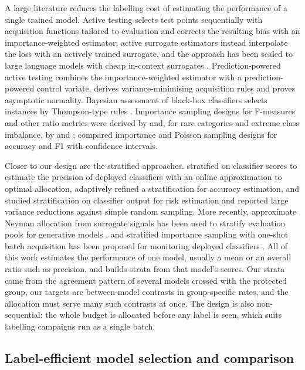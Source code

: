 A large literature reduces the labelling cost of estimating the performance of a single trained model. Active testing \citep{kossen2021active} selects test points sequentially with acquisition functions tailored to evaluation and corrects the resulting bias with an importance-weighted estimator; active surrogate estimators \citep{kossen2022ase} instead interpolate the loss with an actively trained surrogate, and the approach has been scaled to large language models with cheap in-context surrogates \citep{berrada2025}. Prediction-powered active testing \citep{ashouritaklimi2026} combines the importance-weighted estimator with a prediction-powered control variate, derives variance-minimising acquisition rules and proves asymptotic normality. Bayesian assessment of black-box classifiers selects instances by Thompson-type rules \citep{ji2021active}. Importance sampling designs for F-measures and other ratio metrics were derived by \citet{sawade2010fmeasure} and, for rare categories and extreme class imbalance, by \citet{poms2021} and \citet{marchant2017}; \citet{yilmaz2021} compared importance and Poisson sampling designs for accuracy and F1 with confidence intervals.

Closer to our design are the stratified approaches. \citet{bennett2010online} stratified on classifier scores to estimate the precision of deployed classifiers with an online approximation to optimal allocation, \citet{katariya2012} adaptively refined a stratification for accuracy estimation, and \citet{kumar2018classifier} studied stratification on classifier output for risk estimation and reported large variance reductions against simple random sampling. More recently, approximate Neyman allocation from surrogate signals has been used to stratify evaluation pools for generative models \citep{liu2026neyman}, and stratified importance sampling with one-shot batch acquisition has been proposed for monitoring deployed classifiers \citep{marsigli2026}. All of this work estimates the performance of one model, usually a mean or an overall ratio such as precision, and builds strata from that model's scores. Our strata come from the agreement pattern of several models crossed with the protected group, our targets are between-model contrasts in group-specific rates, and the allocation must serve many such contrasts at once. The design is also non-sequential: the whole budget is allocated before any label is seen, which suits labelling campaigns run as a single batch.

\subsection{Label-efficient model selection and comparison}

